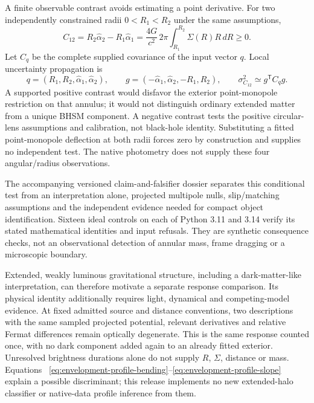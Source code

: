 A finite observable contrast avoids estimating a point derivative. For
two independently constrained radii $0<R_1<R_2$ under the same assumptions,
\begin{equation}
 C_{12}=R_2\widehat\alpha_2-R_1\widehat\alpha_1
 =\frac{4G}{c^2}\,2\pi\int_{R_1}^{R_2}\Sigma(R)R\,dR\geq0.
 \label{eq:envelopment-annular-contrast}
\end{equation}
Let $C_q$ be the complete supplied covariance of the input vector $q$.
Local uncertainty propagation is
\begin{equation*}
 q=(R_1,R_2,\widehat\alpha_1,\widehat\alpha_2),\qquad
 g=(-\widehat\alpha_1,\widehat\alpha_2,-R_1,R_2),\qquad
 \sigma_{C_{12}}^2\simeq g^{\mathsf T}C_qg.
\end{equation*}
A supported positive contrast would disfavor the exterior point-monopole
restriction on that annulus; it would not distinguish ordinary extended
matter from a unique BHSM component. A negative contrast tests the
positive circular-lens assumptions and calibration, not black-hole identity.
Substituting a fitted point-monopole deflection at both radii forces zero
by construction and supplies no independent test. The native photometry
does not supply these four angular/radius observations.

The accompanying versioned claim-and-falsifier dossier separates this
conditional test from an interpretation alone, projected multipole nulls,
slip/matching assumptions and the independent evidence needed for compact
object identification. Sixteen ideal controls on each of Python 3.11 and
3.14 verify its stated mathematical identities and input refusals. They
are synthetic consequence checks, not an observational detection of
annular mass, frame dragging or a microscopic boundary.

Extended, weakly luminous gravitational structure, including a
dark-matter-like interpretation, can therefore motivate a separate
response comparison. Its physical identity additionally requires
light, dynamical and competing-model evidence. At fixed admitted source
and distance conventions, two descriptions with
the same sampled projected potential, relevant derivatives and
relative Fermat differences remain optically degenerate. This is the
same response counted once, with no dark component added again to an
already fitted exterior. Unresolved brightness durations alone do not
supply $R$, $\Sigma$, distance or mass. Equations~
\eqref{eq:envelopment-profile-bending}--\eqref{eq:envelopment-profile-slope}
explain a possible discriminant; this release implements no new
extended-halo classifier or native-data profile inference from them.

